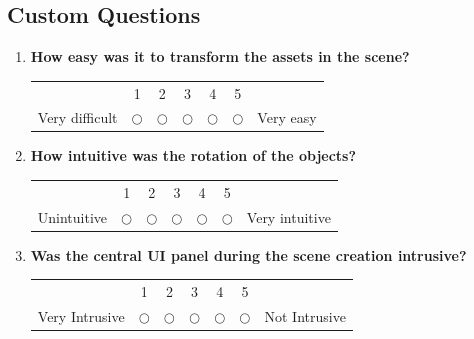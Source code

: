 \documentclass[inscr,ack,preface]{dithesis}
\begin{document}
\begin{appendix}
  \section{Custom Questions}
  \begin{enumerate}
    \item \begin{minipage}[t]{\linewidth}
            \textbf{How easy was it to transform the assets in the scene?}
            \begin{center}
              \small
              \renewcommand{\arraystretch}{1.5}
              \begin{tabular}{ccccccc}
                               & 1          & 2          & 3          & 4          & 5          &           \\
                Very difficult & $\bigcirc$ & $\bigcirc$ & $\bigcirc$ & $\bigcirc$ & $\bigcirc$ & Very easy
              \end{tabular}
            \end{center}
          \end{minipage}

    \item \begin{minipage}[t]{\linewidth}
            \textbf{How intuitive was the rotation of the objects?}
            \begin{center}
              \small
              \renewcommand{\arraystretch}{1.5}
              \begin{tabular}{ccccccc}
                            & 1          & 2          & 3          & 4          & 5          &                \\
                Unintuitive & $\bigcirc$ & $\bigcirc$ & $\bigcirc$ & $\bigcirc$ & $\bigcirc$ & Very intuitive
              \end{tabular}
            \end{center}
          \end{minipage}

    \item \begin{minipage}[t]{\linewidth}
            \textbf{Was the central UI panel during the scene creation intrusive?}
            \begin{center}
              \small
              \renewcommand{\arraystretch}{1.5}
              \begin{tabular}{ccccccc}
                               & 1          & 2          & 3          & 4          & 5          &               \\
                Very Intrusive & $\bigcirc$ & $\bigcirc$ & $\bigcirc$ & $\bigcirc$ & $\bigcirc$ & Not Intrusive
              \end{tabular}
            \end{center}
          \end{minipage}


\end{enumerate}
\end{appendix}
\end{document}
